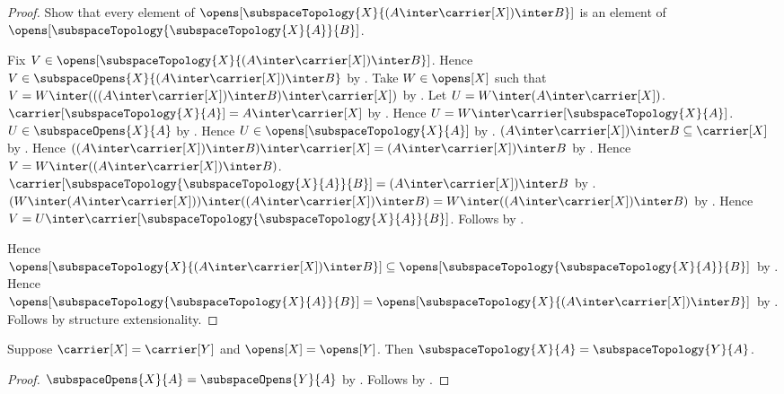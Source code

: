 \begin{proof}
    Show that every element of
        $\opens[\subspaceTopology{X}{(A\inter\carrier[X])\inter B}]$
        is an element of
        $\opens[\subspaceTopology{\subspaceTopology{X}{A}}{B}]$.
    \begin{subproof}
        Fix $V\in
            \opens[\subspaceTopology{X}{(A\inter\carrier[X])\inter B}]$.
        Hence $V\in\subspaceOpens{X}{(A\inter\carrier[X])\inter B}$ by
            .
        Take $W\in\opens[X]$ such that
            $V=W\inter(((A\inter\carrier[X])\inter B)
                \inter\carrier[X])$ by
            .
        Let $U=W\inter(A\inter\carrier[X])$.
        $\carrier[\subspaceTopology{X}{A}]=A\inter\carrier[X]$ by
            .
        Hence $U=W\inter\carrier[\subspaceTopology{X}{A}]$.
        $U\in\subspaceOpens{X}{A}$ by
            .
        Hence $U\in\opens[\subspaceTopology{X}{A}]$ by
            .
        $(A\inter\carrier[X])\inter B\subseteq\carrier[X]$ by
            .
        Hence $((A\inter\carrier[X])\inter B)\inter\carrier[X]
            =(A\inter\carrier[X])\inter B$ by
            .
        Hence $V=W\inter((A\inter\carrier[X])\inter B)$.
        $\carrier[\subspaceTopology{\subspaceTopology{X}{A}}{B}]
            =(A\inter\carrier[X])\inter B$ by
            .
        $(W\inter(A\inter\carrier[X]))
            \inter((A\inter\carrier[X])\inter B)
            =W\inter((A\inter\carrier[X])\inter B)$ by
            .
        Hence $V=U\inter
            \carrier[\subspaceTopology{\subspaceTopology{X}{A}}{B}]$.
        Follows by .
    \end{subproof}
    Hence $\opens[\subspaceTopology{X}{(A\inter\carrier[X])\inter B}]
        \subseteq
        \opens[\subspaceTopology{\subspaceTopology{X}{A}}{B}]$ by
        .
    Hence $\opens[\subspaceTopology{\subspaceTopology{X}{A}}{B}]
        =\opens[\subspaceTopology{X}{(A\inter\carrier[X])\inter B}]$ by
        .
    Follows by structure extensionality.
\end{proof}

\begin{theorem}\label{subspace_topology_same_fields}
    Suppose $\carrier[X]=\carrier[Y]$ and $\opens[X]=\opens[Y]$.
    Then $\subspaceTopology{X}{A}=\subspaceTopology{Y}{A}$.
\end{theorem}
\begin{proof}
    $\subspaceOpens{X}{A}=\subspaceOpens{Y}{A}$ by
        .
    Follows by .
\end{proof}

